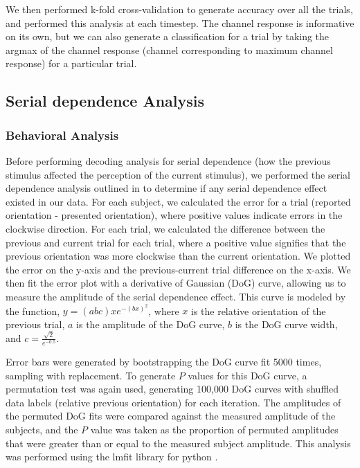 \documentclass[../main.tex]{subfiles}
\begin{document}
We then performed k-fold cross-validation to generate accuracy over all the trials, and performed this analysis at each timestep. The channel response is informative on its own, but we can also generate a classification for a trial by taking the argmax of the channel response (channel corresponding to maximum channel response) for a particular trial.

\subsection{Serial dependence Analysis}

\subsubsection{Behavioral Analysis}
Before performing decoding analysis for serial dependence (how the previous stimulus affected the perception of the current stimulus), we performed the serial dependence analysis outlined in \cite{fischer_whitney_2014} to determine if any serial dependence effect existed in our data. For each subject, we calculated the error for a trial (reported orientation - presented orientation), where positive values indicate errors in the clockwise direction. For each trial, we calculated the difference between the previous and current trial for each trial, where a positive value signifies that the previous orientation was more clockwise than the current orientation. We plotted the error on the y-axis and the previous-current trial difference on the x-axis. We then fit the error plot with a derivative of Gaussian (DoG) curve, allowing us to measure the amplitude of the serial dependence effect. This curve is modeled by the function, $y = (a b c) x e^{-(b x)^2}$, where $x$ is the relative orientation of the previous trial, $a$ is the amplitude of the DoG curve, $b$ is the DoG curve width, and
$c = \frac{\sqrt{2}}{e^{-0.5}}$.

Error bars were generated by bootstrapping the DoG curve fit 5000 times, sampling with replacement. To generate $P$ values for this DoG curve, a permutation test was again used, generating 100,000 DoG curves with shuffled data labels (relative previous orientation) for each iteration. The amplitudes of the permuted DoG fits were compared against the measured amplitude of the subjects, and the $P$ value was taken as the proportion of permuted amplitudes that were greater than or equal to the measured subject amplitude. This analysis was performed using the lmfit library for python \citep{newville_matthew_2014_11813}.
\end{document}
